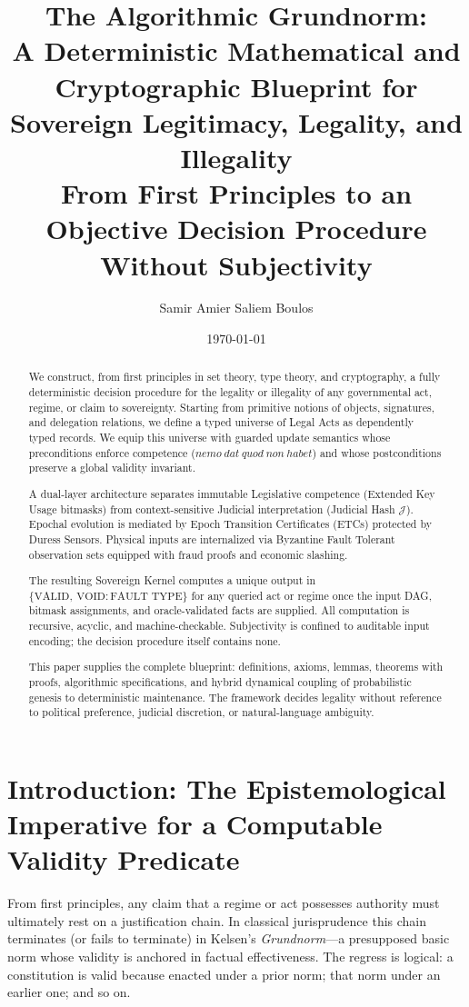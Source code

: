 \documentclass[11pt,a4paper]{article}
\title{\textbf{The Algorithmic Grundnorm:\\A Deterministic Mathematical and Cryptographic Blueprint for Sovereign Legitimacy, Legality, and Illegality\\[0.5em]
\large From First Principles to an Objective Decision Procedure Without Subjectivity}}
\author{Samir Amier Saliem Boulos}
\date{\today}
\begin{document}
\maketitle

\begin{abstract}
We construct, from first principles in set theory, type theory, and cryptography, a fully deterministic decision procedure for the legality or illegality of any governmental act, regime, or claim to sovereignty. Starting from primitive notions of objects, signatures, and delegation relations, we define a typed universe of Legal Acts as dependently typed records. We equip this universe with guarded update semantics whose preconditions enforce competence (\(nemo\ dat\ quod\ non\ habet\)) and whose postconditions preserve a global validity invariant.  

A dual-layer architecture separates immutable Legislative competence (Extended Key Usage bitmasks) from context-sensitive Judicial interpretation (Judicial Hash \(\mathcal{J}\)). Epochal evolution is mediated by Epoch Transition Certificates (ETCs) protected by Duress Sensors. Physical inputs are internalized via Byzantine Fault Tolerant observation sets equipped with fraud proofs and economic slashing.  

The resulting Sovereign Kernel computes a unique output in \(\{\text{VALID},\ \text{VOID}:\text{FAULT TYPE}\}\) for any queried act or regime once the input DAG, bitmask assignments, and oracle-validated facts are supplied. All computation is recursive, acyclic, and machine-checkable. Subjectivity is confined to auditable input encoding; the decision procedure itself contains none.  

This paper supplies the complete blueprint: definitions, axioms, lemmas, theorems with proofs, algorithmic specifications, and hybrid dynamical coupling of probabilistic genesis to deterministic maintenance. The framework decides legality without reference to political preference, judicial discretion, or natural-language ambiguity.
\end{abstract}

\section{Introduction: The Epistemological Imperative for a Computable Validity Predicate}

From first principles, any claim that a regime or act possesses authority must ultimately rest on a justification chain. In classical jurisprudence this chain terminates (or fails to terminate) in Kelsen's \emph{Grundnorm}---a presupposed basic norm whose validity is anchored in factual effectiveness. The regress is logical: a constitution is valid because enacted under a prior norm; that norm under an earlier one; and so on.  
\end{document}
